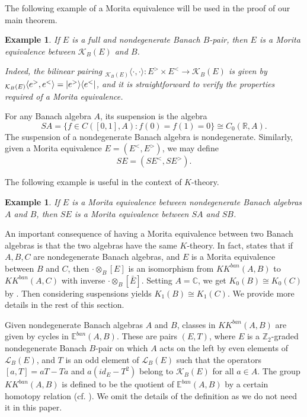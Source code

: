 \documentclass[a4,11pt]{amsart}
\newtheorem{ex}[thm]{Example}
\theoremstyle{remark}
\DeclarePairedDelimiter\bra{\langle}{\rvert}
\DeclarePairedDelimiter\ket{\lvert}{\rangle}
\begin{document}


The following example of a Morita equivalence will be used in the proof of our main theorem.

\begin{ex} \label{ex:compact}
If $E$ is a full and nondegenerate Banach $B$-pair, then $E$ is a Morita equivalence between $\mathcal{K}_B(E)$ and $B$.

Indeed, the bilinear pairing ${}_{\mathcal{K}_B(E)}\langle\cdot,\cdot\rangle:E^>\times E^<\rightarrow\mathcal{K}_B(E)$ is given by ${}_{\mathcal{K}_B(E)}\langle e^>,e^<\rangle=\ket{e^>}\bra{e^<}$, and it is straightforward to verify the properties required of a Morita equivalence.
\end{ex}

For any Banach algebra $A$, its suspension is the algebra \[SA=\{ f\in C([0,1],A):f(0)=f(1)=0 \}\cong C_0(\mathbb{R},A).\]
The suspension of a nondegenerate Banach algebra is nondegenerate.
Similarly, given a Morita equivalence $E=(E^<,E^>)$, we may define \[SE=(SE^<,SE^>).\]

The following example is useful in the context of $K$-theory.

\begin{ex}
If $E$ is a Morita equivalence between nondegenerate Banach algebras $A$ and $B$, then $SE$ is a Morita equivalence between $SA$ and $SB$.
\end{ex}

An important consequence of having a Morita equivalence between two Banach algebras is that the two algebras have the same $K$-theory.
In fact, \cite[Theorem 5.29]{Par09} states that if $A,B,C$ are nondegenerate Banach algebras, and $E$ is a Morita equivalence between $B$ and $C$, then $\cdot\otimes_B[E]$ is an isomorphism from $KK^{ban}(A,B)$ to $KK^{ban}(A,C)$ with inverse $\cdot\otimes_B[\bar{E}]$.
Setting $A=\mathbb{C}$, we get $K_0(B)\cong K_0(C)$ by \cite[Th\'{e}or\`{e}me 1.2.8]{Laf02}.
Then considering suspensions yields $K_1(B)\cong K_1(C)$. 
We provide more details in the rest of this section.

Given nondegenerate Banach algebras $A$ and $B$, classes in $KK^{ban}(A,B)$ are given by cycles in $\mathbb{E}^{ban}(A,B)$.
These are pairs $(E,T)$, where $E$ is a $\mathbb{Z}_2$-graded nondegenerate Banach $B$-pair on which $A$ acts on the left by even elements of $\mathcal{L}_B(E)$, and $T$ is an odd element of $\mathcal{L}_B(E)$ such that the operators $[a,T]=aT-Ta$ and $a(id_E-T^2)$ belong to $\mathcal{K}_B(E)$ for all $a\in A$.
The group $KK^{ban}(A,B)$ is defined to be the quotient of $\mathbb{E}^{ban}(A,B)$ by a certain homotopy relation (cf. \cite[D\'{e}finition 1.2.2]{Laf02}).
We omit the details of the definition as we do not need it in this paper.
\end{document}
